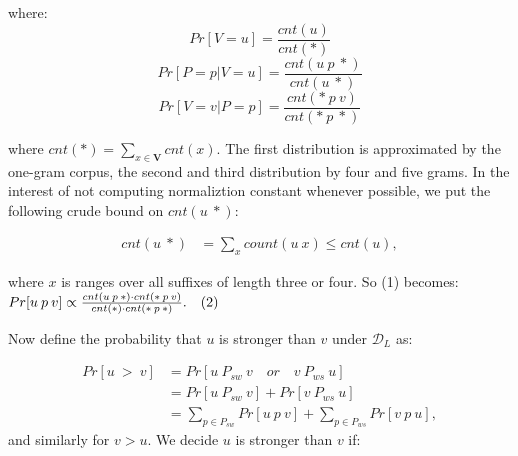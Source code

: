 \documentclass[11pt,letterpaper]{article}
\begin{document}
where:
\[Pr[V = u]               = \frac{cnt(u)}{cnt(*)}\]
\[Pr[P = p | V = u]  = \frac{cnt(u \: p \: *)}{cnt(u \: *)}\]
\[Pr[V = v | P = p]  = \frac{cnt(* \: p \: v)}{cnt(* \: p \: *)}\]

where $cnt(*) = \sum_{x \in \mathbf{V}} cnt(x)$. The first distribution is approximated by the one-gram corpus, the second and third distribution by four and five grams. In the interest of not computing normaliztion constant whenever possible, we put the following crude bound on $cnt(u \: *)$:

\begin{align*}
cnt(u \: *) &= \sum_{x} count(u \: x) \leq cnt(u),
\end{align*}

where $x$ is ranges over all suffixes of length three or four. So (1) becomes:\\

\begin{math}
Pr[u \: p \: v] \propto \frac{ cnt(u \: p \: *) \cdot cnt(* \: p \: v) }{ cnt(*) \cdot cnt(* \: p \: *)}. \quad (2) \\
\end{math}

Now define the probability that $u$ is stronger than $v$ under $\mathcal{D}_L$ as:

\begin{align*}
	Pr[u \: > \: v] &= Pr[ u \: P_{sw} \: v  \quad or \quad v \: P_{ws} \: u] \\
					&= Pr[ u \: P_{sw} \: v] + Pr[ v \: P_{ws} \: u] \\
					&= \sum_{p \in P_{sw}} Pr[u \: p \: v] + \sum_{p \in P_{ws}} Pr[v \: p \: u],
\end{align*}
and similarly for $v > u$. We decide $u$ is stronger than $v$ if:
\end{document}
